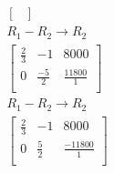 \documentclass[12pt letter]{report}
\begin{document}
{\begin{align*}
\begin{bmatrix}
    \end{bmatrix}
    \\
    R_1 - R_2  \rightarrow R_2            \\
    \begin{bmatrix}
      \frac{2}{3} & -1           & 8000            \\
      0           & \frac{-5}{2} & \frac{11800}{1} \\
    \end{bmatrix}
    \\
    R_1 - R_2  \rightarrow R_2            \\
    \begin{bmatrix}
      \frac{2}{3} & -1          & 8000             \\
      0           & \frac{5}{2} & \frac{-11800}{1} \\
    \end{bmatrix}
  \end{align*}

}
\end{document}
